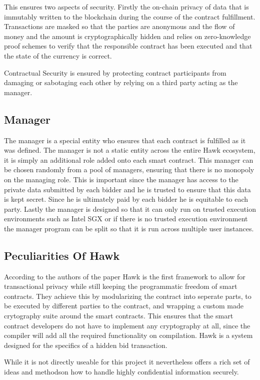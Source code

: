 This ensures two aspects of security. Firstly the on-chain privacy of data that is immutably written to the blockchain during the course of the contract fulfillment. Transactions are masked so that the parties are anonymous and the flow of money and the amount is cryptographically hidden and relies on zero-knowledge proof schemes to verify that the responsible contract has been executed and that the state of the currency is correct.

Contractual Security is ensured by protecting contract participants from damaging or sabotaging each other by relying on a third party acting as the manager.

\subsection{Manager}
The manager is a special entity who ensures that each contract is fulfilled as it was defined. The manager is not a static entity across the entire Hawk ecosystem, it is simply an additional role added onto each smart contract. This manager can be chosen randomly from a pool of managers, ensuring that there is no monopoly on the managing role. This is important since the manager has access to the private data submitted by each bidder and he is trusted to ensure that this data is kept secret. Since he is ultimately paid by each bidder he is equitable to each party. Lastly the manager is designed so that it can only run on trusted execution environments such as Intel SGX or if there is no trusted execution environment the manager program can be split so that it is run across multiple user instances.

\subsection{Peculiarities Of Hawk}
According to the authors of the paper Hawk is the first framework to allow for transactional privacy while still keeping the programmatic freedom of smart contracts. They achieve this by modularizing the contract into seperate parts, to be executed by different parties to the contract, and wrapping a custom made crytography suite around the smart contracts. This ensures that the smart contract developers do not have to implement any cryptography at all, since the compiler will add all the required functionality on compilation. Hawk is a system designed for the specifics of a hidden bid transaction.

While it is not directly useable for this project it nevertheless offers a rich set of ideas and methodson how to handle highly confidential information securely.

